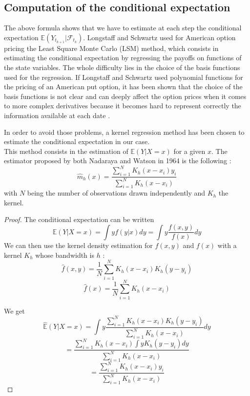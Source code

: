\documentclass[a4paper,11pt,english]{book}
\begin{document}
\subsection{Computation of the conditional expectation}
\label{subsec:conditional-expectation}
The above formula shows that we have to estimate at each step the conditional expectation $\mathbb{E}(Y_{t_{k+1}}|\mathcal{F}_{t_k})$. Longstaff and Schwartz \cite{schwartz2001valuing} used for American option pricing the Least Square Monte Carlo (LSM) method, which consists in estimating the conditional expectation by regressing the payoffs on functions of the state variables. The whole difficulty lies in the choice of the basis functions used for the regression. If Longstaff and Schwartz used polynomial functions for the pricing of an American put option, it has been shown that the choice of the basis functions is not clear and can deeply affect the option prices when it comes to more complex derivatives because it becomes hard to represent correctly the information available at each date \cite{moreno2003robustness}.

In order to avoid those problems, a kernel regression method has been chosen to estimate the conditional expectation in our case.\\

This method consists in the estimation of $\mathbb{E}(Y|X=x)$ for a given $x$. The estimator proposed by both Nadaraya \cite{nadaraya1964estimating} and Watson \cite{watson1964smooth} in 1964 is the following : $$\hat{m}_{h}(x)=\frac{\sum_{i=1}^{N}K_{h}(x-x_{i})y_{i}}{\sum_{i=1}^{N}K_{h}(x-x_{i})}$$
with $N$ being the number of observations drawn independently and $K_h$ the kernel.\\

\begin{proof}
The conditional expectation can be written $$\mathbb{E}(Y|X=x)=\int yf(y|x)dy = \int y\frac{f(x,y)}{f(x)}dy$$
We can then use the kernel density estimation for $f(x,y)$ and $f(x)$ with a kernel $K_{h}$ whose bandwidth is $h$ : $$\hat{f}(x,y) = \frac{1}{N}\sum_{i=1}^{N}K_{h}(x-x_{i})K_{h}(y-y_{i})$$
$$\hat{f}(x) = \frac{1}{N}\sum_{i=1}^{N}K_{h}(x-x_{i})$$

We get $$\hat{\mathbb{E}}(Y|X=x) = \int y\frac{\sum_{i=1}^{N}K_{h}(x-x_{i})K_{h}(y-y_{i})}{\sum_{i=1}^{N}K_{h}(x-x_{i})}dy$$
$$=\frac{\sum_{i=1}^{N}K_{h}(x-x_{i})\int y K_{h}(y-y_{i})dy }{\sum_{i=1}^{N}K_{h}(x-x_{i})}$$
$$=\frac{\sum_{i=1}^{N}K_{h}(x-x_{i})y_{i}}{\sum_{i=1}^{N}K_{h}(x-x_{i})}$$
\end{proof}
\end{document}
